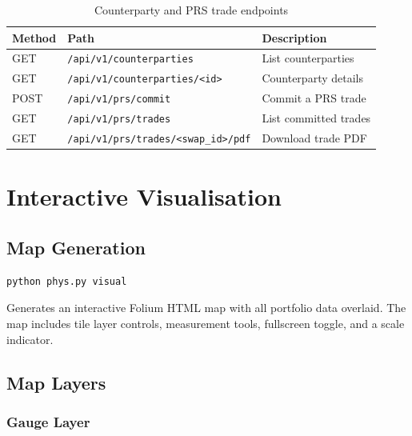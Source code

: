\documentclass[11pt,a4paper]{article}
\begin{document}
\begin{table}[H]
    \centering
    \caption{Counterparty and PRS trade endpoints}
    \begin{tabular}{@{}lll@{}}
        \toprule
        \textbf{Method} & \textbf{Path} & \textbf{Description} \\
        \midrule
        GET  & \texttt{/api/v1/counterparties}                & List counterparties \\
        GET  & \texttt{/api/v1/counterparties/<id>}            & Counterparty details \\
        POST & \texttt{/api/v1/prs/commit}                     & Commit a PRS trade \\
        GET  & \texttt{/api/v1/prs/trades}                     & List committed trades \\
        GET  & \texttt{/api/v1/prs/trades/<swap\_id>/pdf}      & Download trade PDF \\
        \bottomrule
    \end{tabular}
\end{table}

\section{Interactive Visualisation}

\subsection{Map Generation}

\begin{lstlisting}[language=bash]
python phys.py visual
\end{lstlisting}

Generates an interactive Folium HTML map with all portfolio data overlaid.
The map includes tile layer controls, measurement tools, fullscreen toggle,
and a scale indicator.

\subsection{Map Layers}

\subsubsection{Gauge Layer}
\end{document}
